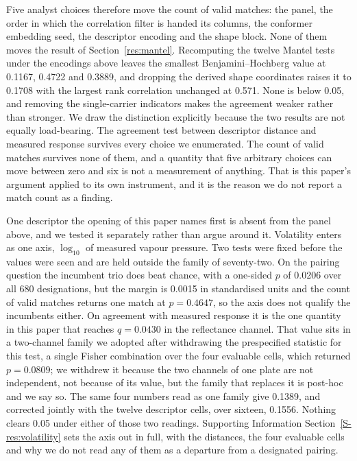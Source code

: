 \documentclass[journal=jacsat,manuscript=article,margin=1in]{achemso}
\begin{document}
Five analyst choices therefore move the count of valid matches: the panel,
the order in which the correlation filter is handed its columns, the
conformer embedding seed, the descriptor encoding and the shape block. None
of them moves the result of Section~\ref{res:mantel}. Recomputing the twelve
Mantel tests under the encodings above leaves the smallest
Benjamini--Hochberg value at 0.1167, 0.4722 and 0.3889, and dropping the
derived shape coordinates raises it to 0.1708 with the largest rank
correlation unchanged at 0.571. None is below 0.05, and removing the
single-carrier indicators makes the agreement weaker rather than stronger. We draw the
distinction explicitly because the two results are not equally load-bearing.
The agreement test between descriptor distance and measured response
survives every choice we enumerated. The count of valid matches survives
none of them, and a quantity that five arbitrary choices can move between
zero and six is not a measurement of anything. That is this paper's
argument applied to its own instrument, and it is the reason we do not
report a match count as a finding.

One descriptor the opening of this paper names first is absent from the panel
above, and we tested it separately rather than argue around it. Volatility
enters as one axis, $\log_{10}$ of measured vapour pressure. Two tests were
fixed before the values were seen and are held outside the family of
seventy-two. On the pairing question the incumbent trio does beat chance, with
a one-sided $p$ of 0.0206 over all 680 designations, but the margin is 0.0015
in standardised units and the count of valid matches returns one match at
$p = 0.4647$, so the axis does not qualify the incumbents either. On agreement
with measured response it is the one quantity in this paper that reaches
$q = 0.0430$ in the reflectance channel. That value sits in a two-channel
family we adopted after withdrawing the prespecified statistic for this test,
a single Fisher combination over the four evaluable cells, which returned
$p = 0.0809$; we withdrew it because the two channels of one plate are not
independent, not because of its value, but the family that replaces it is
post-hoc and we say so. The same four numbers read as one family give 0.1389,
and corrected jointly with the twelve descriptor cells, over sixteen, 0.1556.
Nothing clears 0.05 under either of those two readings. Supporting Information
Section~\ref{S-res:volatility} sets the axis out in full, with the distances,
the four evaluable cells and why we do not read any of them as a departure
from a designated pairing.
\end{document}
